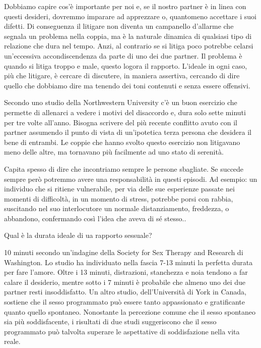 \documentclass[12pt]{book} %
\begin{document}
Dobbiamo capire cos'è importante per noi e, se il nostro partner è in linea con questi desideri, dovremmo imparare ad apprezzare o, quantomeno accettare i suoi
difetti. Di conseguenza il litigare non diventa un campanello d'allarme che segnala un problema
nella coppia, ma è la naturale dinamica di qualsiasi tipo di relazione che dura nel tempo. Anzi, al contrario se si
litiga poco potrebbe celarsi un'eccessiva accondiscendenza da parte di uno dei due partner. Il
problema è quando si litiga troppo e male, questo logora il rapporto.
L'ideale in ogni caso, più che litigare, è cercare di discutere, in maniera assertiva, cercando di dire quello che dobbiamo dire ma tenendo dei toni contenuti e senza essere offensivi.

Secondo uno studio della Northwestern University c'è un buon esercizio che permette di allenarci a vedere i motivi del
disaccordo e, dura solo sette minuti per tre volte all'anno. Bisogna scrivere del più recente
conflitto avuto con il partner assumendo il punto di vista di un'ipotetica terza persona che desidera il bene di
entrambi. Le coppie che hanno svolto questo esercizio non litigavano meno delle altre, ma tornavano più facilmente ad
uno stato di serenità.

Capita spesso di dire che incontriamo sempre le persone sbagliate. Se succede sempre però potremmo avere una responsabilità in questi episodi. 
Ad esempio: un individuo che si ritiene vulnerabile, per via delle sue esperienze passate nei
momenti di difficoltà, in un momento di stress, potrebbe porsi con rabbia, suscitando nel suo interlocutore un normale
distanziamento, freddezza, o abbandono, confermando così l'idea che aveva di sé stesso..

\begin{mdframed}[linewidth=1pt]
Qual è la durata ideale di ua rapporto sessuale?

10 minuti secondo un'indagine della Society for Sex Therapy and Research di Washington. Lo studio ha individuato nella
fascia 7-13 minuti la perfetta durata per fare l'amore. Oltre i 13 minuti, distrazioni, stanchezza e noia tendono a far
calare il desiderio, mentre sotto i 7 minuti è probabile che almeno uno dei due partner resti insoddisfatto.
Un altro studio, dell’Università di York in Canada, sostiene che il sesso programmato può essere tanto appassionato e gratificante quanto quello spontaneo. Nonostante la percezione comune che il sesso spontaneo sia più soddisfacente, i risultati di due studi suggeriscono che il sesso programmato può talvolta superare le aspettative di soddisfazione nella vita reale.
\end{mdframed}
\end{document}
